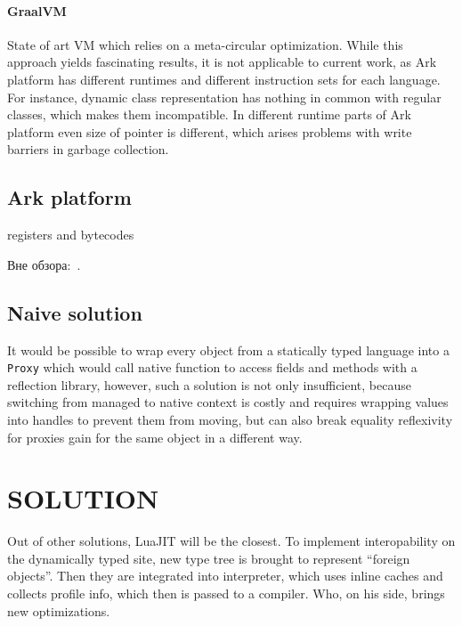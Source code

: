 \documentclass[times, %
			   specification,annotation, %
			   titlepage-extra-ru,specification-extra-ru,annotation-extra-ru, %
			   languages={russian,english} %
			  ]{itmo-student-thesis}
\begin{document}
\subsubsection{GraalVM}
State of art VM which relies on a meta-circular optimization. While this approach yields fascinating results, it is not applicable to current work, as Ark platform has different runtimes and different instruction sets for each language. For instance, dynamic class representation has nothing in common with regular classes, which makes them incompatible. In different runtime parts of Ark platform even size of pointer is different, which arises problems with write barriers in garbage collection.

\section{Ark platform}
\TODO
registers and bytecodes

\finishrelatedwork

Вне обзора:~\cite{bellman}.

\section{Naive solution}
It would be possible to wrap every object from a statically typed language into a \texttt{Proxy} which would call native function to access fields and methods with a reflection library, however, such a solution is not only insufficient, because switching from managed to native context is costly and requires wrapping values into handles to prevent them from moving, but can also break equality reflexivity for proxies gain for the same object in a different way.

\chapter{SOLUTION}

Out of other solutions, LuaJIT will be the closest. To implement interopability on the dynamically typed site, new type tree is brought to represent ``foreign objects''. Then they are integrated into interpreter, which uses inline caches and collects profile info, which then is passed to a compiler. Who, on his side, brings new optimizations.
\end{document}
